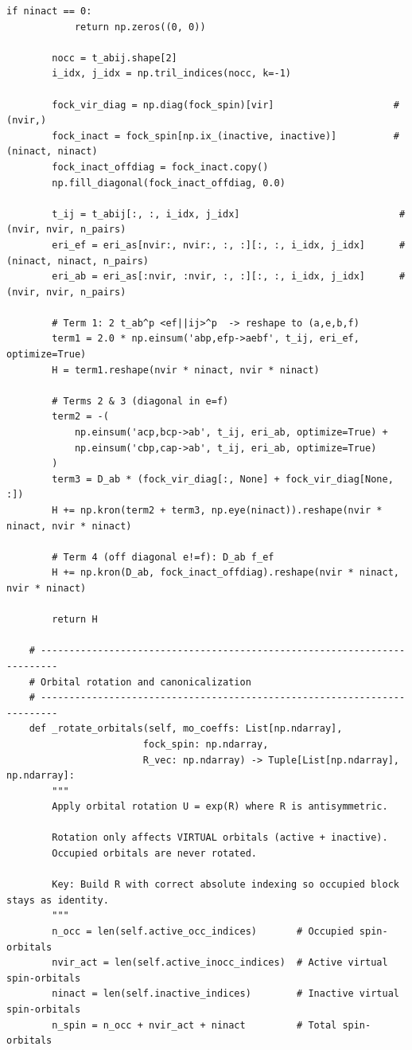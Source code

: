 \begin{lstlisting}[style=python, caption={...}, label=lst:full_code]
        if ninact == 0:
            return np.zeros((0, 0))

        nocc = t_abij.shape[2]
        i_idx, j_idx = np.tril_indices(nocc, k=-1)

        fock_vir_diag = np.diag(fock_spin)[vir]                     # (nvir,)
        fock_inact = fock_spin[np.ix_(inactive, inactive)]          # (ninact, ninact)
        fock_inact_offdiag = fock_inact.copy()
        np.fill_diagonal(fock_inact_offdiag, 0.0)

        t_ij = t_abij[:, :, i_idx, j_idx]                            # (nvir, nvir, n_pairs)
        eri_ef = eri_as[nvir:, nvir:, :, :][:, :, i_idx, j_idx]      # (ninact, ninact, n_pairs)
        eri_ab = eri_as[:nvir, :nvir, :, :][:, :, i_idx, j_idx]      # (nvir, nvir, n_pairs)

        # Term 1: 2 t_ab^p <ef||ij>^p  -> reshape to (a,e,b,f)
        term1 = 2.0 * np.einsum('abp,efp->aebf', t_ij, eri_ef, optimize=True)
        H = term1.reshape(nvir * ninact, nvir * ninact)

        # Terms 2 & 3 (diagonal in e=f)
        term2 = -(
            np.einsum('acp,bcp->ab', t_ij, eri_ab, optimize=True) +
            np.einsum('cbp,cap->ab', t_ij, eri_ab, optimize=True)
        )
        term3 = D_ab * (fock_vir_diag[:, None] + fock_vir_diag[None, :])
        H += np.kron(term2 + term3, np.eye(ninact)).reshape(nvir * ninact, nvir * ninact)

        # Term 4 (off diagonal e!=f): D_ab f_ef
        H += np.kron(D_ab, fock_inact_offdiag).reshape(nvir * ninact, nvir * ninact)

        return H

    # -------------------------------------------------------------------------
    # Orbital rotation and canonicalization
    # -------------------------------------------------------------------------
    def _rotate_orbitals(self, mo_coeffs: List[np.ndarray],
                        fock_spin: np.ndarray,
                        R_vec: np.ndarray) -> Tuple[List[np.ndarray], np.ndarray]:
        """
        Apply orbital rotation U = exp(R) where R is antisymmetric.
        
        Rotation only affects VIRTUAL orbitals (active + inactive).
        Occupied orbitals are never rotated.
        
        Key: Build R with correct absolute indexing so occupied block stays as identity.
        """
        n_occ = len(self.active_occ_indices)       # Occupied spin-orbitals
        nvir_act = len(self.active_inocc_indices)  # Active virtual spin-orbitals
        ninact = len(self.inactive_indices)        # Inactive virtual spin-orbitals
        n_spin = n_occ + nvir_act + ninact         # Total spin-orbitals
        

\end{lstlisting}
